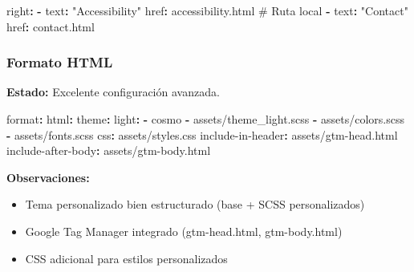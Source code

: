 \documentclass[
  doc,
  floatsintext,
  longtable,
  a4paper,
  nolmodern,
  notxfonts,
  notimes,
  12pt,
  colorlinks=true,linkcolor=blue,citecolor=blue,urlcolor=blue]{apa7}
\newenvironment{Shaded}{\begin{snugshade}}{\end{snugshade}}
\newcommand{\AttributeTok}[1]{\textcolor[rgb]{0.40,0.45,0.13}{#1}}
\newcommand{\CommentTok}[1]{\textcolor[rgb]{0.37,0.37,0.37}{#1}}
\newcommand{\FunctionTok}[1]{\textcolor[rgb]{0.28,0.35,0.67}{#1}}
\newcommand{\KeywordTok}[1]{\textcolor[rgb]{0.00,0.23,0.31}{\textbf{#1}}}
\newcommand{\StringTok}[1]{\textcolor[rgb]{0.13,0.47,0.30}{#1}}
\providecommand{\tightlist}{%
  \setlength{\itemsep}{0pt}\setlength{\parskip}{0pt}}
\begin{document}
\begin{Shaded}
\begin{Highlighting}[]
\FunctionTok{right}\KeywordTok{:}
\AttributeTok{  }\KeywordTok{{-}}\AttributeTok{ }\FunctionTok{text}\KeywordTok{:}\AttributeTok{ }\StringTok{"Accessibility"}
\AttributeTok{    }\FunctionTok{href}\KeywordTok{:}\AttributeTok{ accessibility.html}\CommentTok{         \# Ruta local}
\AttributeTok{  }\KeywordTok{{-}}\AttributeTok{ }\FunctionTok{text}\KeywordTok{:}\AttributeTok{ }\StringTok{"Contact"}
\AttributeTok{    }\FunctionTok{href}\KeywordTok{:}\AttributeTok{ contact.html}
\end{Highlighting}
\end{Shaded}

\subsubsection{Formato HTML}\label{formato-html-1}

\textbf{Estado:} Excelente configuración avanzada.

\begin{Shaded}
\begin{Highlighting}[]
\FunctionTok{format}\KeywordTok{:}
\AttributeTok{  }\FunctionTok{html}\KeywordTok{:}
\AttributeTok{    }\FunctionTok{theme}\KeywordTok{:}
\AttributeTok{      }\FunctionTok{light}\KeywordTok{:}
\AttributeTok{        }\KeywordTok{{-}}\AttributeTok{ cosmo}
\AttributeTok{        }\KeywordTok{{-}}\AttributeTok{ assets/theme\_light.scss}
\AttributeTok{        }\KeywordTok{{-}}\AttributeTok{ assets/colors.scss}
\AttributeTok{        }\KeywordTok{{-}}\AttributeTok{ assets/fonts.scss}
\AttributeTok{    }\FunctionTok{css}\KeywordTok{:}\AttributeTok{ assets/styles.css}
\AttributeTok{    }\FunctionTok{include{-}in{-}header}\KeywordTok{:}\AttributeTok{ assets/gtm{-}head.html}
\AttributeTok{    }\FunctionTok{include{-}after{-}body}\KeywordTok{:}\AttributeTok{ assets/gtm{-}body.html}
\end{Highlighting}
\end{Shaded}

\textbf{Observaciones:}

\begin{itemize}
\tightlist
\item
  Tema personalizado bien estructurado (base + SCSS personalizados)
\item
  Google Tag Manager integrado (gtm-head.html, gtm-body.html)
\item
  CSS adicional para estilos personalizados
\end{itemize}
\end{document}
